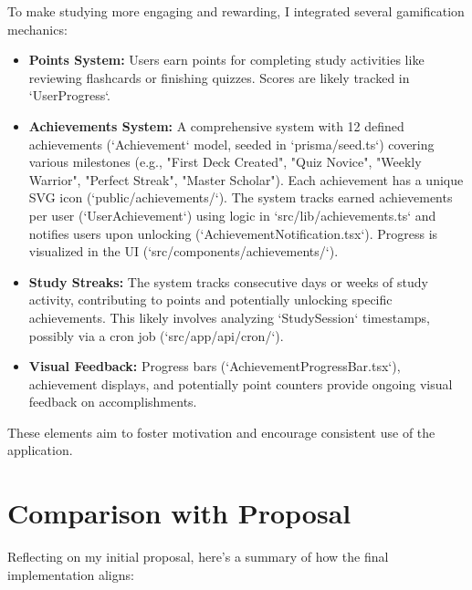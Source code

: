 \documentclass[
	letterpaper,
	11pt
]{jdf}
\begin{document}
To make studying more engaging and rewarding, I integrated several gamification mechanics:
\begin{itemize}
    \item \textbf{Points System:} Users earn points for completing study activities like reviewing flashcards or finishing quizzes. Scores are likely tracked in `UserProgress`.
    \item \textbf{Achievements System:} A comprehensive system with 12 defined achievements (`Achievement` model, seeded in `prisma/seed.ts`) covering various milestones (e.g., "First Deck Created", "Quiz Novice", "Weekly Warrior", "Perfect Streak", "Master Scholar"). Each achievement has a unique SVG icon (`public/achievements/`). The system tracks earned achievements per user (`UserAchievement`) using logic in `src/lib/achievements.ts` and notifies users upon unlocking (`AchievementNotification.tsx`). Progress is visualized in the UI (`src/components/achievements/`).
    \item \textbf{Study Streaks:} The system tracks consecutive days or weeks of study activity, contributing to points and potentially unlocking specific achievements. This likely involves analyzing `StudySession` timestamps, possibly via a cron job (`src/app/api/cron/`).
    \item \textbf{Visual Feedback:} Progress bars (`AchievementProgressBar.tsx`), achievement displays, and potentially point counters provide ongoing visual feedback on accomplishments.
\end{itemize}
These elements aim to foster motivation and encourage consistent use of the application.
\newpage
\section{Comparison with Proposal}

Reflecting on my initial proposal, here’s a summary of how the final implementation aligns:
\end{document}
